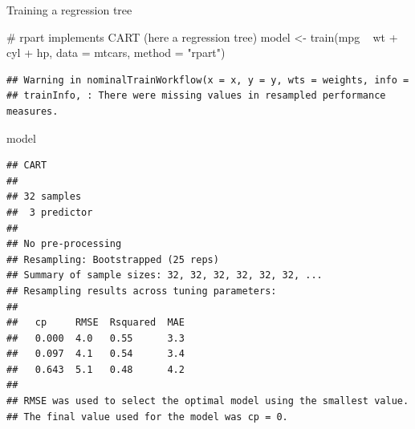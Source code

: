\documentclass[9pt,ignorenonframetext,]{beamer}
\newenvironment{Shaded}{\begin{snugshade}}{\end{snugshade}}
\newcommand{\CommentTok}[1]{\textcolor[rgb]{0.50,0.62,0.50}{#1}}
\newcommand{\DataTypeTok}[1]{\textcolor[rgb]{0.87,0.87,0.75}{#1}}
\newcommand{\KeywordTok}[1]{\textcolor[rgb]{0.94,0.87,0.69}{#1}}
\newcommand{\NormalTok}[1]{\textcolor[rgb]{0.80,0.80,0.80}{#1}}
\newcommand{\OperatorTok}[1]{\textcolor[rgb]{0.94,0.94,0.82}{#1}}
\newcommand{\StringTok}[1]{\textcolor[rgb]{0.80,0.58,0.58}{#1}}
\begin{document}
\begin{frame}[fragile]{Training a regression tree}
\protect\hypertarget{training-a-regression-tree}{}

\small

\begin{Shaded}
\begin{Highlighting}[]
\CommentTok{# rpart implements CART (here a regression tree)}
\NormalTok{model <-}\StringTok{ }\KeywordTok{train}\NormalTok{(mpg }\OperatorTok{~}\StringTok{ }\NormalTok{wt }\OperatorTok{+}\StringTok{ }\NormalTok{cyl }\OperatorTok{+}\StringTok{ }\NormalTok{hp,}
               \DataTypeTok{data =}\NormalTok{ mtcars,}
               \DataTypeTok{method =} \StringTok{"rpart"}\NormalTok{)}
\end{Highlighting}
\end{Shaded}

\begin{verbatim}
## Warning in nominalTrainWorkflow(x = x, y = y, wts = weights, info =
## trainInfo, : There were missing values in resampled performance measures.
\end{verbatim}

\begin{Shaded}
\begin{Highlighting}[]
\NormalTok{model}
\end{Highlighting}
\end{Shaded}

\begin{verbatim}
## CART 
## 
## 32 samples
##  3 predictor
## 
## No pre-processing
## Resampling: Bootstrapped (25 reps) 
## Summary of sample sizes: 32, 32, 32, 32, 32, 32, ... 
## Resampling results across tuning parameters:
## 
##   cp     RMSE  Rsquared  MAE
##   0.000  4.0   0.55      3.3
##   0.097  4.1   0.54      3.4
##   0.643  5.1   0.48      4.2
## 
## RMSE was used to select the optimal model using the smallest value.
## The final value used for the model was cp = 0.
\end{verbatim}

\end{frame}
\end{document}
